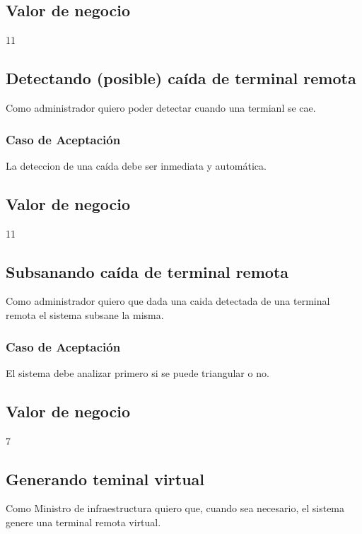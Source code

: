 \subsection*{Valor de negocio}
11

\linea \subsection*{Detectando (posible) caída de terminal remota}
Como administrador quiero poder detectar cuando una termianl se cae.
\subsubsection*{Caso de Aceptación}
La deteccion de una caída debe ser inmediata y automática.
\subsection*{Valor de negocio}
11


\linea \subsection*{Subsanando caída de terminal remota}
Como administrador quiero que dada una caida detectada de una terminal remota el sistema subsane la misma.
\subsubsection*{Caso de Aceptación}
El sistema debe analizar primero si se puede triangular o no.
\subsection*{Valor de negocio}
7


\linea \subsection*{Generando teminal virtual}
Como Ministro de infraestructura quiero que, cuando sea necesario, el sistema genere una terminal remota virtual.
